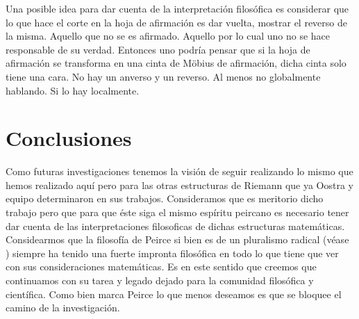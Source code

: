 \documentclass[
	fontsize=10pt, %
	twoside=true, %
	secnumdepth=1, %
	abstract=true, %
]{kaohandt}
\begin{document}
Una posible idea para dar cuenta de la interpretación filosófica es considerar que lo que hace el corte en la hoja de afirmación es dar vuelta, mostrar el reverso de la misma. Aquello que no se es afirmado. Aquello por lo cual uno no se hace responsable de su verdad. Entonces uno podría pensar que si la hoja de afirmación se transforma en una cinta de Möbius de afirmación, dicha cinta solo tiene una cara. No hay un anverso y un reverso. Al menos no globalmente hablando. Si lo hay localmente.  


\section{Conclusiones} %
\label{sec:Conclusiones}

Como futuras investigaciones tenemos la visión de seguir realizando lo mismo que hemos realizado aquí pero para las otras estructuras de Riemann que ya Oostra y equipo determinaron en sus trabajos. Consideramos que es meritorio dicho trabajo pero que para que éste siga el mismo espíritu peircano es necesario tener dar cuenta de las interpretaciones filosoficas de dichas estructuras matemáticas. Considearmos que la filosofía de Peirce si bien es de un pluralismo radical (véase \cite{rosenthal1994}) siempre ha tenido una fuerte impronta filosófica en todo lo que tiene que ver con sus consideraciones matemáticas. Es en este sentido que creemos que continuamos con su tarea y legado dejado para la comunidad filosófica y científica. Como bien marca Peirce lo que menos deseamos es que se bloquee el camino de la investigación.


%
%



\printbibliography[title=Bibliografía] %
\nocite{peirce1931}
\end{document}

